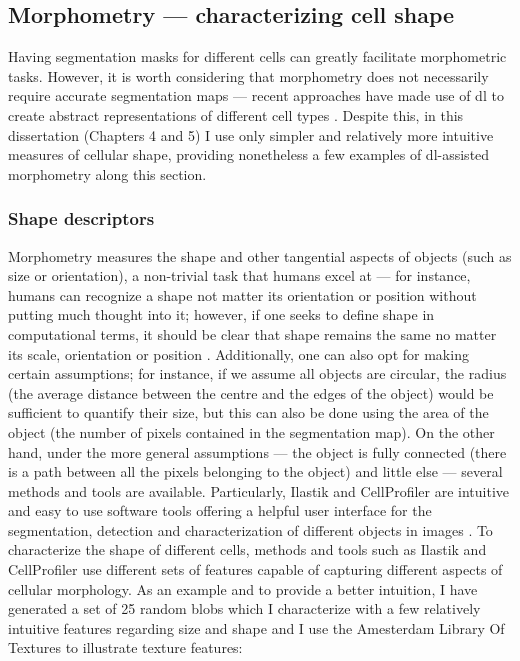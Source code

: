 \subsection{Morphometry --- characterizing cell shape}

Having segmentation masks for different cells can greatly facilitate morphometric tasks. However, it is worth considering that morphometry does not necessarily require accurate segmentation maps --- recent approaches have made use of \ac{dl} to create abstract representations of different cell types \cite{Sommer2017-uj,Wei2021-gw}. Despite this, in this dissertation (Chapters 4 and 5) I use only simpler and relatively more intuitive measures of cellular shape, providing nonetheless a few examples of \ac{dl}-assisted morphometry along this section. 

\subsubsection{Shape descriptors}

Morphometry measures the shape and other tangential aspects of objects (such as size or orientation), a non-trivial task that humans excel at --- for instance, humans can recognize a shape not matter its orientation or position without putting much thought into it; however, if one seeks to define shape in computational terms, it should be clear that shape remains the same no matter its scale, orientation or position \cite{Kendall1977-yx}. Additionally, one can also opt for making certain assumptions; for instance, if we assume all objects are circular, the radius (the average distance between the centre and the edges of the object) would be sufficient to quantify their size, but this can also be done using the area of the object (the number of pixels contained in the segmentation map). On the other hand, under the more general assumptions --- the object is fully connected (there is a path between all the pixels belonging to the object) and little else --- several methods and tools are available. Particularly, Ilastik and CellProfiler are intuitive and easy to use software tools offering a helpful user interface for the segmentation, detection and characterization of different objects in images \cite{Sommer2011-ds,Carpenter2006-hy}. To characterize the shape of different cells, methods and tools such as Ilastik and CellProfiler use different sets of features capable of capturing different aspects of cellular morphology. As an example and to provide a better intuition, I have generated a set of 25 random blobs which I characterize with a few relatively intuitive features regarding size and shape and I use the Amesterdam Library Of Textures \cite{Burghouts2009-ln} to illustrate texture features:

